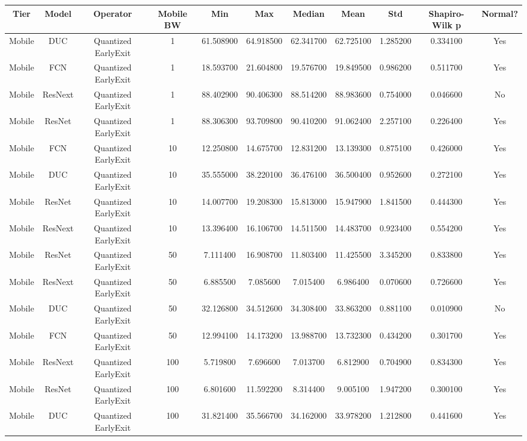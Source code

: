 \begin{tabular}{|c||c||c||c||c||c||c||c||c||c||c|}
\toprule
Tier & Model & Operator & Mobile BW & Min & Max & Median & Mean & Std & Shapiro-Wilk p & Normal? \\
\midrule
Mobile & DUC & Quantized EarlyExit & 1 & 61.508900 & 64.918500 & 62.341700 & 62.725100 & 1.285200 & 0.334100 & Yes \\
Mobile & FCN & Quantized EarlyExit & 1 & 18.593700 & 21.604800 & 19.576700 & 19.849500 & 0.986200 & 0.511700 & Yes \\
Mobile & ResNext & Quantized EarlyExit & 1 & 88.402900 & 90.406300 & 88.514200 & 88.983600 & 0.754000 & 0.046600 & No \\
Mobile & ResNet & Quantized EarlyExit & 1 & 88.306300 & 93.709800 & 90.410200 & 91.062400 & 2.257100 & 0.226400 & Yes \\
Mobile & FCN & Quantized EarlyExit & 10 & 12.250800 & 14.675700 & 12.831200 & 13.139300 & 0.875100 & 0.426000 & Yes \\
Mobile & DUC & Quantized EarlyExit & 10 & 35.555000 & 38.220100 & 36.476100 & 36.500400 & 0.952600 & 0.272100 & Yes \\
Mobile & ResNet & Quantized EarlyExit & 10 & 14.007700 & 19.208300 & 15.813000 & 15.947900 & 1.841500 & 0.444300 & Yes \\
Mobile & ResNext & Quantized EarlyExit & 10 & 13.396400 & 16.106700 & 14.511500 & 14.483700 & 0.923400 & 0.554200 & Yes \\
Mobile & ResNet & Quantized EarlyExit & 50 & 7.111400 & 16.908700 & 11.803400 & 11.425500 & 3.345200 & 0.833800 & Yes \\
Mobile & ResNext & Quantized EarlyExit & 50 & 6.885500 & 7.085600 & 7.015400 & 6.986400 & 0.070600 & 0.726600 & Yes \\
Mobile & DUC & Quantized EarlyExit & 50 & 32.126800 & 34.512600 & 34.308400 & 33.863200 & 0.881100 & 0.010900 & No \\
Mobile & FCN & Quantized EarlyExit & 50 & 12.994100 & 14.173200 & 13.988700 & 13.732300 & 0.434200 & 0.301700 & Yes \\
Mobile & ResNext & Quantized EarlyExit & 100 & 5.719800 & 7.696600 & 7.013700 & 6.812900 & 0.704900 & 0.834300 & Yes \\
Mobile & ResNet & Quantized EarlyExit & 100 & 6.801600 & 11.592200 & 8.314400 & 9.005100 & 1.947200 & 0.300100 & Yes \\
Mobile & DUC & Quantized EarlyExit & 100 & 31.821400 & 35.566700 & 34.162000 & 33.978200 & 1.212800 & 0.441600 & Yes \\

\end{tabular}
